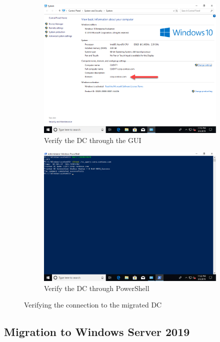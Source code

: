 \begin{figure}[h]\ContinuedFloat
	\begin{subfigure}{0.5\textwidth}
		\captionsetup{width=0.8\linewidth}
		\includegraphics[width=0.9\linewidth]{img/Verification_WS_2.png}
		\centering
		\caption{Verify the DC through the GUI}
		\label{fig:verification2}
	\end{subfigure}
	\begin{subfigure}{0.5\textwidth}
		\captionsetup{width=0.8\linewidth}
		\includegraphics[width=0.9\linewidth]{img/Verification_WS_3.png} 
		\centering
		\caption{Verify the DC through PowerShell}
		\label{fig:verification3}
	\end{subfigure}
	\caption{Verifying the connection to the migrated DC}
	\label{fig:verification}
\end{figure}
\clearpage

\subsection{Migration to Windows Server 2019}
